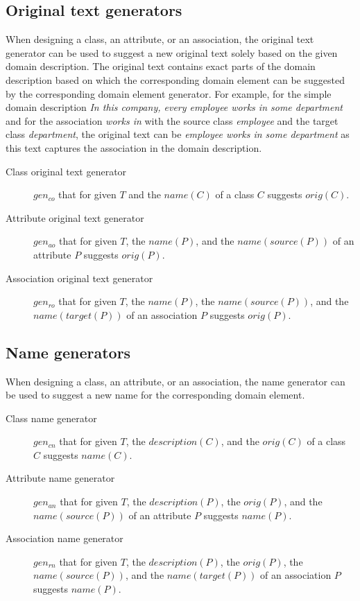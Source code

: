 \subsection{Original text generators}

When designing a class, an attribute, or an association, the original text generator can be used to suggest a new original text solely based on the given domain description. The original text contains exact parts of the domain description based on which the corresponding domain element can be suggested by the corresponding domain element generator. For example, for the simple domain description \textit{In this company, every employee works in some department} and for the association \textit{works in} with the source class \textit{employee} and the target class \textit{department}, the original text can be \textit{employee works in some department} as this text captures the association in the domain description.

\begin{description}
\item [Class original text generator] $gen_{co}$ that for given $T$ and the $name(C)$ of a class $C$ suggests $orig(C)$.

\item [Attribute original text generator] $gen_{ao}$ that for given $T$, the $name(P)$, and the $name(source(P))$ of an attribute $P$ suggests $orig(P)$.

\item [Association original text generator] $gen_{ro}$ that for given $T$, the $name(P)$, the $name(source(P))$, and the $name(target(P))$ of an association $P$ suggests $orig(P)$.
\end{description}


\subsection{Name generators}

When designing a class, an attribute, or an association, the name generator can be used to suggest a new name for the corresponding domain element.

\begin{description}
\item [Class name generator] $gen_{cn}$ that for given $T$, the $description(C)$, and the $orig(C)$ of a class $C$ suggests  $name(C)$.

\item [Attribute name generator] $gen_{an}$ that for given $T$, the $description(P)$, the $orig(P)$, and the $name(source(P))$ of an attribute $P$ suggests $name(P)$.

\item [Association name generator] $gen_{rn}$ that for given $T$, the $description(P)$, the $orig(P)$, the $name(source(P))$, and the $name(target(P))$ of an association $P$ suggests $name(P)$.
\end{description}


